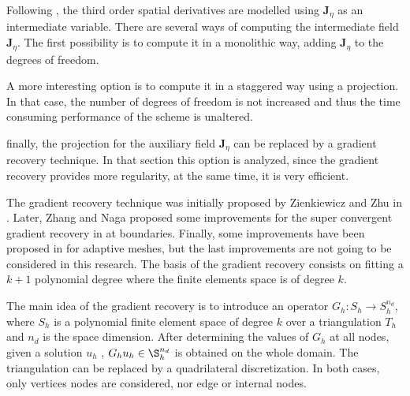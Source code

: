 Following \cite{walkley2002}, the third order spatial derivatives are modelled using $\mathbf{J}_\eta$ as an intermediate variable. There are several ways of computing the intermediate field $\mathbf{J}_\eta$. The first possibility is to compute it in a monolithic way, adding $\mathbf{J}_\eta$ to the degrees of freedom.

A more interesting option is to compute it in a staggered way using a projection. In that case, the number of degrees of freedom is not increased and thus the time consuming performance of the scheme is unaltered. 

finally, the projection for the auxiliary field $\mathbf{J}_\eta$ can be replaced by a gradient recovery technique. In that section this option is analyzed, since the gradient recovery provides more regularity, at the same time, it is very efficient.

The gradient recovery technique was initially proposed by Zienkiewicz and Zhu in \cite{zienkiewicz1992}. Later, Zhang and Naga proposed some improvements for the super convergent gradient recovery in \cite{zhang2005} at boundaries. Finally, some improvements have been proposed in \cite{wu2007,ahmed2021} for adaptive meshes, but the last improvements are not going to be considered in this research. The basis of the gradient recovery consists on fitting a $k+1$ polynomial degree where the finite elements space is of degree $k$.

The main idea of the gradient recovery is to introduce an operator $G_h : S_h \rightarrow S_h^{n_d}$, where $S_h$ is a polynomial finite element space of degree $k$ over a triangulation $T_h$ and $n_d$ is the space dimension. After determining the values of $G_h$ at all nodes, given a solution $u_h$ , $G_h u_h \in \S_h^{n_d}$ is obtained on the whole domain.
The triangulation can be replaced by a quadrilateral discretization. In both cases, only vertices nodes are considered, nor edge or internal nodes.

